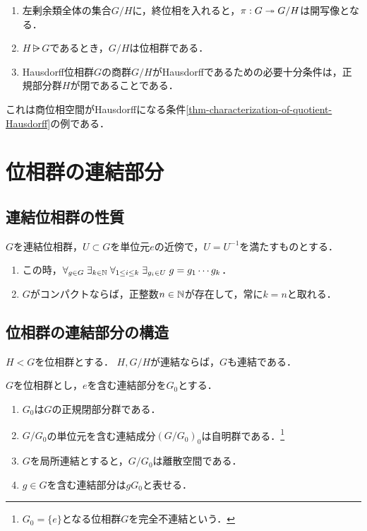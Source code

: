 \documentclass[uplatex,dvipdfmx]{jsreport}
\begin{document}
\begin{proposition}\mbox{}
    \begin{enumerate}
        \item 左剰余類全体の集合$G/H$に，終位相を入れると，$\pi:G\twoheadrightarrow G/H$は開写像となる．
        \item $H\rsub G$であるとき，$G/H$は位相群である．
        \item Hausdorff位相群$G$の商群$G/H$がHausdorffであるための必要十分条件は，正規部分群$H$が閉であることである．
    \end{enumerate}
\end{proposition}
\begin{remarks}
    これは商位相空間がHausdorffになる条件\ref{thm-characterization-of-quotient-Hausdorff}の例である．
\end{remarks}

\section{位相群の連結部分}

\subsection{連結位相群の性質}

\begin{theorem}
    $G$を連結位相群，$U\subset G$を単位元$e$の近傍で，$U=U^{-1}$を満たすものとする．
    \begin{enumerate}
        \item この時，$\forall_{g\in G}\;\exists_{k\in\mathbb{N}}\;\forall_{1\le i\le k}\;\exists_{g_i\in U}\;g=g_1\cdots g_k$．
        \item $G$がコンパクトならば，正整数$n\in\mathbb{N}$が存在して，常に$k=n$と取れる．
    \end{enumerate}
\end{theorem}

\subsection{位相群の連結部分の構造}

\begin{lemma}
    $H<G$を位相群とする．
    $H,G/H$が連結ならば，$G$も連結である．
\end{lemma}

\begin{theorem}
    $G$を位相群とし，$e$を含む連結部分を$G_0$とする．
    \begin{enumerate}
        \item $G_0$は$G$の正規閉部分群である．
        \item $G/G_0$の単位元を含む連結成分$(G/G_0)_0$は自明群である．\footnote{$G_0=\{e\}$となる位相群$G$を完全不連結という．}
        \item $G$を局所連結とすると，$G/G_0$は離散空間である．
        \item $g\in G$を含む連結部分は$gG_0$と表せる．
    \end{enumerate}
\end{theorem}
\end{document}
